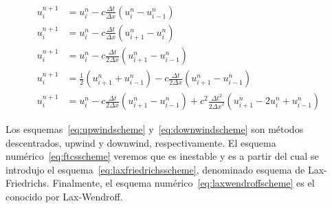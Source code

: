 \begin{frame}
    \frametitle{\secname}

    \begin{example}[Esquemas numéricos de un paso $u^{n+1}=\mathcal{N}\left(u^{n}\right)$]
        \begin{align}
            u^{n+1}_{i} & =
            u^{n}_{i}-
            c\frac{\Delta t}{\Delta x}
            \left(
            u^{n}_{i}-
            u^{n}_{i-1}
            \right)\label{eq:upwindscheme}        \\
            u^{n+1}_{i} & =
            u^{n}_{i}-
            c\frac{\Delta t}{\Delta x}
            \left(
            u^{n}_{i+1}-
            u^{n}_{i}
            \right)\label{eq:downwindscheme}      \\
            u^{n+1}_{i} & =
            u^{n}_{i}-
            c\frac{\Delta t}{2\Delta x}
            \left(
            u^{n}_{i+1}-u^{n}_{i-1}
            \right)\label{eq:ftcsscheme}          \\
            u^{n+1}_{i} & =
            \frac{1}{2}
            \left(
            u^{n}_{i+1}+
            u^{n}_{i-1}
            \right)-
            c\frac{\Delta t}{2\Delta x}
            \left(
            u^{n}_{i+1}-
            u^{n}_{i-1}
            \right)\label{eq:laxfriedrichsscheme} \\
            u^{n+1}_{i} & =
            u^{n}_{i}-
            c\frac{\Delta t}{2\Delta x}
            \left(
            u^{n}_{i+1}-
            u^{n}_{i-1}
            \right)+
            c^{2}
            \frac{{\Delta t}^{2}}{2{\Delta x}^{2}}
            \left(
            u^{n}_{i+1}-
            2u^{n}_{i}+
            u^{n}_{i-1}
            \right)\label{eq:laxwendroffscheme}
        \end{align}

        Los esquemas~\eqref{eq:upwindscheme} y~\eqref{eq:downwindscheme} son
        métodos descentrados, upwind y downwind, respectivamente.
        El esquema numérico~\eqref{eq:ftcsscheme} veremos que es inestable y
        es a partir del cual se introdujo el
        esquema~\eqref{eq:laxfriedrichsscheme}, denominado esquema de
        Lax-Friedrichs.
        Finalmente, el esquema numérico~\eqref{eq:laxwendroffscheme} es el
        conocido por Lax-Wendroff.
    \end{example}
\end{frame}

